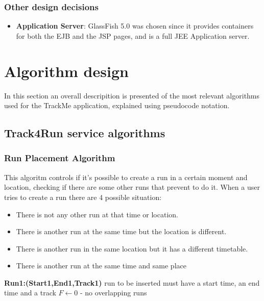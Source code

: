 \documentclass[12pt]{article}
\begin{document}
\subsubsection{Other design decisions}

\begin{itemize}
    \item \textbf{Application Server}: GlassFish 5.0 was chosen since it provides containers
          for both the EJB and the JSP pages, and is a full JEE Application server.
\end{itemize}



 
\section{Algorithm design}
In this section an overall descripition is presented of the most relevant algorithms used for the TrackMe 
application, explained using pseudocode notation. 
\subsection{Track4Run service algorithms}

\subsubsection{Run Placement Algorithm}
This algoritm controls if it's possible to create a run in a certain moment and location, checking if there
are some other runs that prevent to do it. 
When a user tries to create a run there are 4 possible situation:
\begin{itemize}
    \item There is not any other run at that time or location. 
    \item There is another run at the same time but the location is different. 
    \item There is another run in the same location but it has a different timetable. 
    \item There is another run at the same time and same place 
\end{itemize}

\begin{algorithm}[H]
\textbf{Run1:(Start1,End1,Track1)} run to be inserted must have a start time, an end time and a track\; 
$F\leftarrow 0$   - no overlapping runs\;
\noindent {}

\end{algorithm} 
\end{document}
